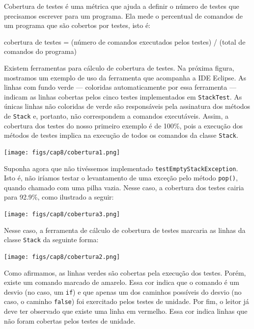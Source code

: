 \documentclass[
  11pt,
  twoside]{book}
\newcommand{\passthrough}[1]{#1}
\renewenvironment{quote}{\centering \vspace{1.5ex} \begin{tcolorbox}[colback=backcolor, width=4.9in]}{\end{tcolorbox}}
\begin{document}
 

 Cobertura de testes é uma métrica
que ajuda a definir o número de testes que precisamos escrever para um
programa. Ela mede o percentual de comandos de um programa que são
cobertos por testes, isto é:

\begin{quote}
cobertura de testes = (número de comandos executados pelos testes) /
(total de comandos do programa)
\end{quote}

Existem ferramentas para cálculo de cobertura de testes. Na próxima
figura, mostramos um exemplo de uso da ferramenta que acompanha a IDE
Eclipse. As linhas com fundo verde --- coloridas automaticamente por
essa ferramenta --- indicam as linhas cobertas pelos cinco testes
implementados em \passthrough{\lstinline!StackTest!}. As únicas linhas
não coloridas de verde são responsáveis pela assinatura dos métodos de
\passthrough{\lstinline!Stack!} e, portanto, não correspondem a comandos
executáveis. Assim, a cobertura dos testes do nosso primeiro exemplo é
de 100\%, pois a execução dos métodos de testes implica na execução de
todos os comandos da classe \passthrough{\lstinline!Stack!}.

\texttt{[image: figs/cap8/cobertura1.png]}

Suponha agora que não tivéssemos implementado
\passthrough{\lstinline!testEmptyStackException!}. Isto é, não iríamos
testar o levantamento de uma exceção pelo método
\passthrough{\lstinline!pop()!}, quando chamado com uma pilha vazia.
Nesse caso, a cobertura dos testes cairia para 92.9\%, como ilustrado a
seguir:

\texttt{[image: figs/cap8/cobertura3.png]}

Nesse caso, a ferramenta de cálculo de cobertura de testes marcaria as
linhas da classe \passthrough{\lstinline!Stack!} da seguinte forma:

\texttt{[image: figs/cap8/cobertura2.png]}

Como afirmamos, as linhas verdes são cobertas pela execução dos testes.
Porém, existe um comando marcado de amarelo. Essa cor indica que o
comando é um desvio (no caso, um \passthrough{\lstinline!if!}) e que
apenas um dos caminhos possíveis do desvio (no caso, o caminho
\passthrough{\lstinline!false!}) foi exercitado pelos testes de unidade.
Por fim, o leitor já deve ter observado que existe uma linha em
vermelho. Essa cor indica linhas que não foram cobertas pelos testes de
unidade.
\end{document}
